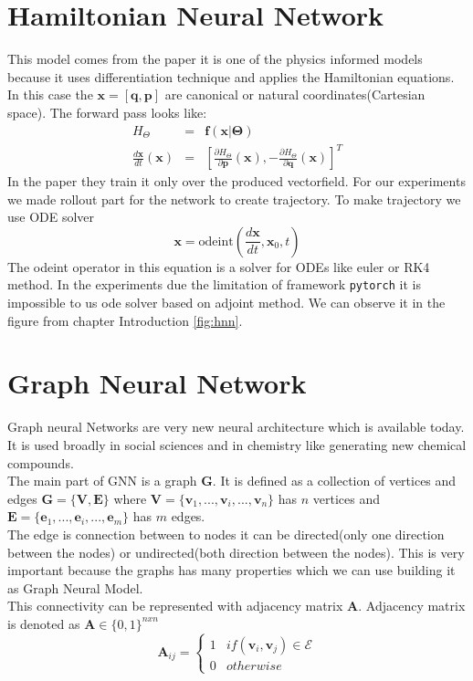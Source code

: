 \section{Hamiltonian Neural Network}
This model comes from the paper \cite{hnn} it is one of the physics informed models because it uses differentiation technique and applies the Hamiltonian equations. In this case the $\mathbf{x} = [\mathbf{q},\mathbf{p}]$ are canonical or natural coordinates(Cartesian space).
The forward pass looks like:
\begin{eqnarray}
	H_{\Theta} &=& \mathbf{f}(\mathbf{x}|\boldsymbol{\Theta})\\
	\frac{d\mathbf{x}}{dt}(\mathbf{x}) &=& \left[\frac{\partial H_{\Theta}}{\partial\mathbf{p}}(\mathbf{x}),-\frac{\partial H_{\Theta}}{\partial\mathbf{q}}(\mathbf{x})\right]^T
\end{eqnarray}
In the paper they train it only over the produced vectorfield.
For our experiments we made rollout part for the network to create trajectory. 
To make trajectory we use ODE solver
\begin{equation}
	\mathbf{x} = \text{odeint}\left(\frac{d\mathbf{x}}{dt},\mathbf{x}_0,t\right)
\end{equation} 
The odeint operator in this equation is a solver for ODEs like euler or RK4 method. In the experiments due the limitation of framework \texttt{pytorch} it is impossible to us ode solver based on adjoint method. We can observe it in the figure from chapter Introduction \ref{fig:hnn}.\\
\section{Graph Neural Network}
Graph neural Networks are very new neural architecture which is available today. It is used broadly in social sciences and in chemistry like generating new chemical compounds.\\
The main part of GNN is a graph $\mathbf{G}$. It is defined as a collection of vertices and edges $\mathbf{G}=\{\mathbf{V},\mathbf{E}\}$ where $\mathbf{V} = \{\mathbf{v}_1,...,\mathbf{v}_i,...,\mathbf{v}_n\}$ has $n$ vertices
and $\mathbf{E} = \{\mathbf{e}_1,...,\mathbf{e}_i,...,\mathbf{e}_m\}$
has $m$ edges.\\
The edge is connection between to nodes it can be directed(only one direction between the nodes) or undirected(both direction between the nodes). This is very important because the graphs has many properties which we can use building it as Graph Neural Model.\\
This connectivity can be represented with adjacency matrix $\mathbf{A}$.
Adjacency matrix is denoted as $\mathbf{A}\in \{0,1\}^{n x n}$ 
\begin{equation}
\mathbf{A}_{ij} =	\left\{\begin{matrix}
		1 & if (\mathbf{v}_i , \mathbf{v}_j)\in\mathcal{E}\\
		0 & otherwise
	\end{matrix}\right.
\end{equation}

